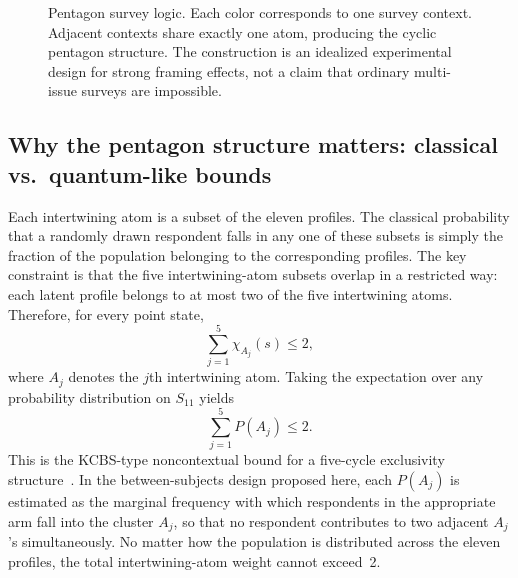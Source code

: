 \documentclass{article}
\begin{document}
\begin{figure}[t]
\caption{Pentagon survey logic. Each color corresponds to one
survey context. Adjacent contexts share exactly one atom, producing
the cyclic pentagon structure. The construction is an idealized
experimental design for strong framing effects, not a claim that
ordinary multi-issue surveys are impossible.}
\label{fig:pentagon}
\end{figure}

\subsection{Why the pentagon structure matters: classical vs.\ quantum-like bounds}
\label{sec:pentagon-bounds}

Each intertwining atom is a subset of the eleven profiles. The
classical probability that a randomly drawn respondent falls in any
one of these subsets is simply the fraction of the population
belonging to the corresponding profiles. The key constraint is that
the five intertwining-atom subsets overlap in a restricted way:
each latent profile belongs to at most two of the five intertwining
atoms. Therefore, for every point state,
\[
\sum_{j=1}^{5}\chi_{A_j}(s)\leq 2,
\]
where $A_j$ denotes the $j$th intertwining atom. Taking the
expectation over any probability distribution on $S_{11}$ yields
\begin{equation}
\sum_{j=1}^{5} P(A_j) \leq 2.
\label{eq:classical_bound}
\end{equation}
This is the KCBS-type noncontextual bound for a five-cycle
exclusivity structure~\cite{Klyachko-2008,Bub-2009}. In the
between-subjects design proposed here, each $P(A_j)$ is estimated
as the marginal frequency with which respondents in the appropriate
arm fall into the cluster $A_j$, so that no respondent contributes
to two adjacent $A_j$'s simultaneously. No matter how the population
is distributed across the eleven profiles, the total
intertwining-atom weight cannot exceed~2.
\end{document}
